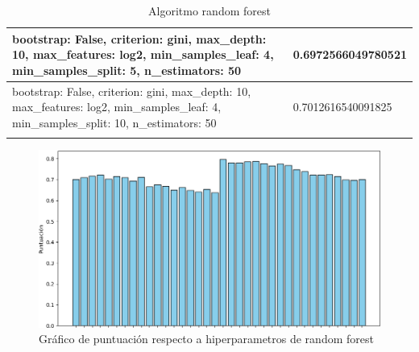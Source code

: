 \documentclass{report}
\begin{document}
{\begin{longtable}{|p{285.6px}|p{100.3px}|}
                    \hline
                    bootstrap: False, criterion: gini, max\_depth: 10, max\_features: log2, min\_samples\_leaf: 4, min\_samples\_split: 5, n\_estimators: 50 & 0.6972566049780521 \\
                    \hline
                    bootstrap: False, criterion: gini, max\_depth: 10, max\_features: log2, min\_samples\_leaf: 4, min\_samples\_split: 10, n\_estimators: 50 & 0.7012616540091825 \\
                    \hline
                    \caption{Algoritmo random forest}
                \end{longtable}
                \begin{figure}[H]
                    \centering
                    \includegraphics[width=1\linewidth]{img/ibai1.png}
                    \caption{Gráfico de puntuación respecto a hiperparametros de random forest}
                \end{figure}
            \clearpage
}
\end{document}

